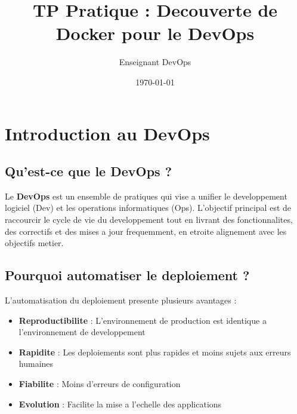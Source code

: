 \documentclass[a4paper,12pt]{article}
\title{\textbf{TP Pratique : Decouverte de Docker pour le DevOps}}
\author{Enseignant DevOps}
\date{\today}
\begin{document}
\maketitle

\begin{center}
\end{center}

\tableofcontents
\newpage

\section{Introduction au DevOps}

\subsection{Qu'est-ce que le DevOps ?}
Le \textbf{DevOps} est un ensemble de pratiques qui vise a unifier le developpement logiciel (Dev) et les operations informatiques (Ops). L'objectif principal est de raccourcir le cycle de vie du developpement tout en livrant des fonctionnalites, des correctifs et des mises a jour frequemment, en etroite alignement avec les objectifs metier.

\subsection{Pourquoi automatiser le deploiement ?}
L'automatisation du deploiement presente plusieurs avantages :
\begin{itemize}
    \item \textbf{Reproductibilite} : L'environnement de production est identique a l'environnement de developpement
    \item \textbf{Rapidite} : Les deploiements sont plus rapides et moins sujets aux erreurs humaines
    \item \textbf{Fiabilite} : Moins d'erreurs de configuration
    \item \textbf{Evolution} : Facilite la mise a l'echelle des applications
\end{itemize}
\end{document}
